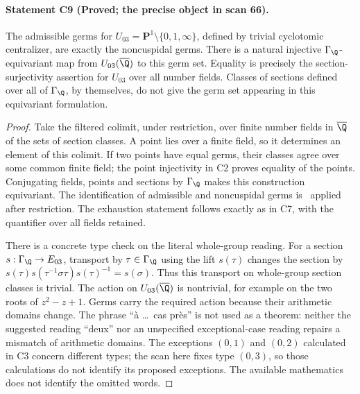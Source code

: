 \paragraph{Statement C9 (Proved; the precise object in scan 66).}\label{res:C9}
The admissible germs for $U_{03}=\mathbf P^1\setminus\{0,1,\infty\}$, defined by trivial cyclotomic centralizer, are exactly the noncuspidal germs. There is a natural injective $\Gamma_\Q$-equivariant map from $U_{03}(\overline\Q)$ to this germ set. Equality is precisely the section-surjectivity assertion for $U_{03}$ over all number fields. Classes of sections defined over all of $\Gamma_\Q$, by themselves, do not give the germ set appearing in this equivariant formulation.
\begin{proof}
Take the filtered colimit, under restriction, over finite number fields in $\overline\Q$ of the sets of section classes. A point lies over a finite field, so it determines an element of this colimit. If two points have equal germs, their classes agree over some common finite field; the point injectivity in C2 proves equality of the points. Conjugating fields, points and sections by $\Gamma_\Q$ makes this construction equivariant. The identification of admissible and noncuspidal germs is \Rtwo\ applied after restriction. The exhaustion statement follows exactly as in C7, with the quantifier over all fields retained.

There is a concrete type check on the literal whole-group reading. For a section $s:\Gamma_\Q\to E_{03}$, transport by $\tau\in\Gamma_\Q$ using the lift $s(\tau)$ changes the section by
$s(\tau)s(\tau^{-1}\sigma\tau)s(\tau)^{-1}=s(\sigma)$.
Thus this transport on whole-group section classes is trivial. The action on $U_{03}(\overline\Q)$ is nontrivial, for example on the two roots of $z^2-z+1$. Germs carry the required action because their arithmetic domains change. The phrase ``à \ldots\ cas près'' is not used as a theorem: neither the suggested reading ``deux'' nor an unspecified exceptional-case reading repairs a mismatch of arithmetic domains. The exceptions $(0,1)$ and $(0,2)$ calculated in C3 concern different types; the scan here fixes type $(0,3)$, so those calculations do not identify its proposed exceptions. The available mathematics does not identify the omitted words.
\end{proof}

